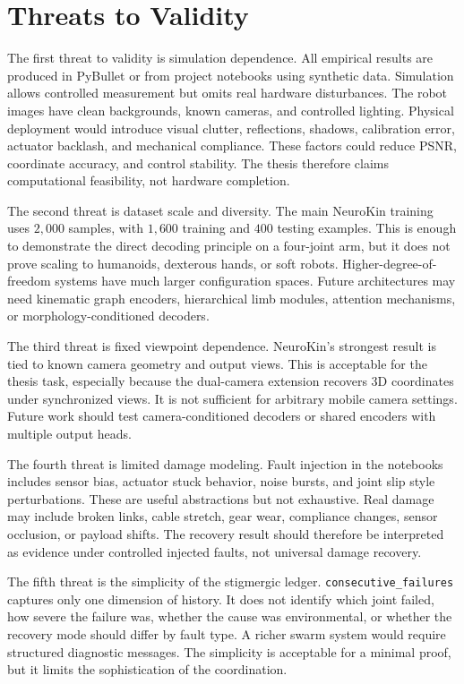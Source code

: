 \documentclass[12pt,a4paper,oneside]{report}
\begin{document}
\section{Threats to Validity}

The first threat to validity is simulation dependence. All empirical results are produced in PyBullet or from project notebooks using synthetic data. Simulation allows controlled measurement but omits real hardware disturbances. The robot images have clean backgrounds, known cameras, and controlled lighting. Physical deployment would introduce visual clutter, reflections, shadows, calibration error, actuator backlash, and mechanical compliance. These factors could reduce PSNR, coordinate accuracy, and control stability. The thesis therefore claims computational feasibility, not hardware completion.

The second threat is dataset scale and diversity. The main NeuroKin training uses $2{,}000$ samples, with $1{,}600$ training and $400$ testing examples. This is enough to demonstrate the direct decoding principle on a four-joint arm, but it does not prove scaling to humanoids, dexterous hands, or soft robots. Higher-degree-of-freedom systems have much larger configuration spaces. Future architectures may need kinematic graph encoders, hierarchical limb modules, attention mechanisms, or morphology-conditioned decoders.

The third threat is fixed viewpoint dependence. NeuroKin's strongest result is tied to known camera geometry and output views. This is acceptable for the thesis task, especially because the dual-camera extension recovers 3D coordinates under synchronized views. It is not sufficient for arbitrary mobile camera settings. Future work should test camera-conditioned decoders or shared encoders with multiple output heads.

The fourth threat is limited damage modeling. Fault injection in the notebooks includes sensor bias, actuator stuck behavior, noise bursts, and joint slip style perturbations. These are useful abstractions but not exhaustive. Real damage may include broken links, cable stretch, gear wear, compliance changes, sensor occlusion, or payload shifts. The recovery result should therefore be interpreted as evidence under controlled injected faults, not universal damage recovery.

The fifth threat is the simplicity of the stigmergic ledger. \texttt{consecutive\_failures} captures only one dimension of history. It does not identify which joint failed, how severe the failure was, whether the cause was environmental, or whether the recovery mode should differ by fault type. A richer swarm system would require structured diagnostic messages. The simplicity is acceptable for a minimal proof, but it limits the sophistication of the coordination.
\end{document}
